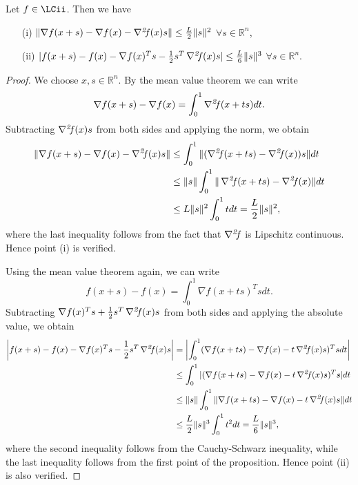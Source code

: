 \documentclass[10pt,a4paper]{article}
\begin{document}
\begin{proposition}\label{prop:arc}
	Let $f\in \LCii$. Then we have
	\begin{itemize}
		\item[(i)] $\|\nabla f(x + s) - \nabla f(x) - \operatorname*{\mathit{\nabla^2 \!f}}(x)s\| \leq \frac{L}{2}\|s\|^2$ $\forall s \in \mathbb{R}^n$,
		\item[(ii)] $|f(x + s) - f(x) - \nabla f(x)^T s - \frac{1}{2}s^T \operatorname*{\mathit{\nabla^2 \!f}}(x)s| \leq \frac{L}{6}\|s\|^3$ $\forall s \in \mathbb{R}^n$.
	\end{itemize}
\end{proposition}
\begin{proof}
	We choose $x, s \in \mathbb{R}^n$. By the mean value theorem we can write
	\begin{equation*}
		\nabla f(x + s) - \nabla f(x) = \int_0^1 \operatorname*{\mathit{\nabla^2 \!f}}(x + ts) dt.
	\end{equation*}
	Subtracting $\operatorname*{\mathit{\nabla^2 \!f}}(x)s$ from both sides and applying the norm, we obtain
	\begin{align*}
		\|\nabla f(x + s) - \nabla f(x) - \operatorname*{\mathit{\nabla^2 \!f}}(x)s\| &\leq \int_0^1 \|(\operatorname*{\mathit{\nabla^2 \!f}}(x + ts) - \operatorname*{\mathit{\nabla^2 \!f}}(x))s\| dt \\
		&\leq \|s\| \int_0^1 \|\operatorname*{\mathit{\nabla^2 \!f}}(x + ts) - \operatorname*{\mathit{\nabla^2 \!f}}(x)\| dt \\
		&\leq L\|s\|^2 \int_0^1 t dt = \frac{L}{2}\|s\|^2,
	\end{align*}
where the last inequality follows from the fact that $\operatorname*{\mathit{\nabla^2 \!f}}$ is Lipschitz continuous. Hence point (i) is verified.
\par Using the mean value theorem again, we can write
	\begin{equation*}
		f(x + s) - f(x) = \int_0^1 \nabla f(x + ts)^T s dt.
	\end{equation*}
	Subtracting $\nabla f(x)^T s + \frac{1}{2}s^T \operatorname*{\mathit{\nabla^2 \!f}}(x)s$ from both sides and applying the absolute value, we obtain
	\begin{align*}
		\left|f(x + s) - f(x) - \nabla f(x)^T s - \frac{1}{2}s^T \operatorname*{\mathit{\nabla^2 \!f}}(x)s\right| &= \left|\int_0^1 (\nabla f(x + ts) - \nabla f(x) - t\operatorname*{\mathit{\nabla^2 \!f}}(x)s)^T s dt\right| \\
		&\leq \int_0^1 |(\nabla f(x + ts) - \nabla f(x) - t\operatorname*{\mathit{\nabla^2 \!f}}(x)s)^T s| dt \\
		&\leq \|s\| \int_0^1 \|\nabla f(x + ts) - \nabla f(x) - t\operatorname*{\mathit{\nabla^2 \!f}}(x)s\| dt \\
		&\leq \frac{L}{2}\|s\|^3 \int_0^1 t^2 dt = \frac{L}{6}\|s\|^3,
	\end{align*}
	where the second inequality follows from the Cauchy-Schwarz inequality, while the last inequality follows from the first point of the proposition. Hence point (ii) is also verified.
\end{proof}
\end{document}
